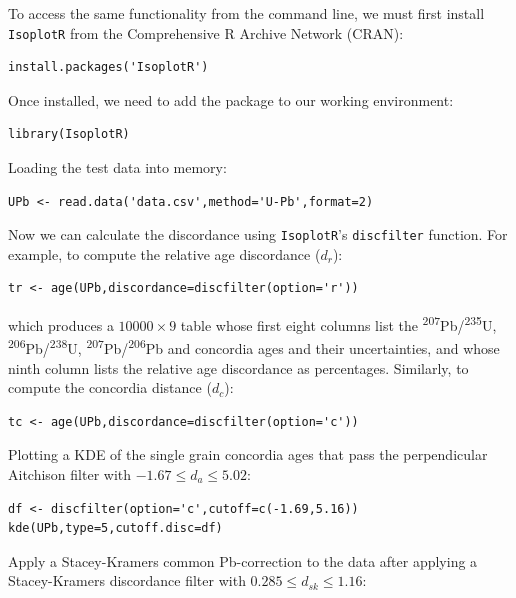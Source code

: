 \documentclass[gchron, manuscript]{copernicus}
\begin{document}
To access the same functionality from the command line, we must first
install \texttt{IsoplotR} from the Comprehensive R Archive Network
(CRAN):

\begin{verbatim}
install.packages('IsoplotR')
\end{verbatim}

\noindent Once installed, we need to add the package to our working
environment:

\begin{verbatim}
library(IsoplotR)
\end{verbatim}

\noindent Loading the test data into memory:

\begin{verbatim}
UPb <- read.data('data.csv',method='U-Pb',format=2)
\end{verbatim}

\noindent Now we can calculate the discordance using
\texttt{IsoplotR}'s \texttt{discfilter} function. For example, to
compute the relative age discordance ($d_r$):

\begin{verbatim}
tr <- age(UPb,discordance=discfilter(option='r'))
\end{verbatim}

\noindent which produces a ${10000}\times{9}$ table whose first eight
columns list the \textsuperscript{207}Pb/\textsuperscript{235}U,
\textsuperscript{206}Pb/\textsuperscript{238}U,
\textsuperscript{207}Pb/\textsuperscript{206}Pb and concordia ages and
their uncertainties, and whose ninth column lists the relative age
discordance as percentages. Similarly, to compute the concordia
distance ($d_c$):

\begin{verbatim}
tc <- age(UPb,discordance=discfilter(option='c'))
\end{verbatim}

\noindent Plotting a KDE of the single grain concordia ages that pass
the perpendicular Aitchison filter with ${-1.67}\leq{d_a}\leq{5.02}$:

\begin{verbatim}
df <- discfilter(option='c',cutoff=c(-1.69,5.16))
kde(UPb,type=5,cutoff.disc=df)
\end{verbatim}

\noindent Apply a Stacey-Kramers common Pb-correction to the data after
applying a Stacey-Kramers discordance filter with
${0.285}\leq{d_{sk}}\leq{1.16}$:
\end{document}
